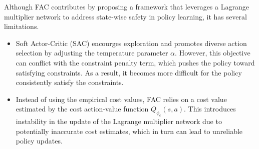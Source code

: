 Although FAC contributes by proposing a framework that leverages a Lagrange multiplier network to address state-wise safety in policy learning, it has several limitations.
\begin{itemize}
  \item 
  Soft Actor-Critic (SAC) encourges exploration and promotes diverse action selection by adjusting the temperature parameter $\alpha$. 
  However, this objective can conflict with the constraint penalty term, which pushes the policy toward satisfying constraints. 
  As a result, it becomes more difficult for the policy consistently satisfy the constraints.
  \item 
  Instead of using the empirical cost values, FAC relies on a cost value estimated by the cost action-value function $Q_{\phi_c}(s, a)$.
  This introduces instability in the update of the Lagrange multiplier network due to potentially inaccurate cost estimates, which in turn can lead to unreliable policy updates.
\end{itemize}